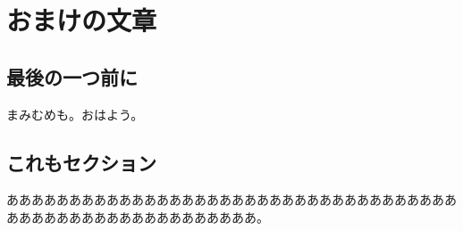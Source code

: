 \chapter{おまけの文章}
\section{最後の一つ前に}
まみむめも。おはよう。
\section{これもセクション}
ああああああああああああああああああああああああああああああああああああああああああああああああああああああああ。